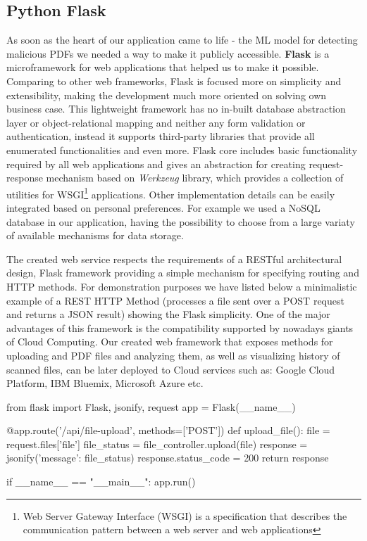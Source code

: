 \subsection{Python Flask}
As soon as the heart of our application came to life - the ML model for detecting malicious PDFs we needed a way to make it publicly accessible. \textbf{Flask} is a microframework for web applications that helped us to make it possible. Comparing to other web frameworks, Flask is focused more on simplicity and extensibility, making the development much more oriented on solving own business case. This lightweight framework has no in-built database abstraction layer or object-relational mapping and neither any form validation or authentication, instead it supports third-party libraries that provide all enumerated functionalities and even more. Flask core includes basic functionality required by all web applications and gives an abstraction for creating request-response mechanism based on \textit{Werkzeug} library, which provides a collection of utilities for WSGI\footnote{Web Server Gateway Interface (WSGI) is a specification that describes the communication pattern between a web server and web applications} applications. Other implementation details can be easily integrated based on personal preferences. For example we used a NoSQL database in our application, having the possibility to choose from a large variaty of available mechanisms for data storage. \par
The created web service respects the requirements of a RESTful architectural design, Flask framework providing a simple mechanism for specifying routing and HTTP methods. For demonstration purposes we have listed below a minimalistic example of a REST HTTP Method (processes a file sent over a POST request and returns a JSON result) showing the Flask simplicity. One of the major advantages of this framework is the compatibility supported by nowadays giants of Cloud Computing. Our created web framework that exposes methods for uploading and PDF files and analyzing them, as well as visualizing history of scanned files, can be later deployed to Cloud services such as: Google Cloud Platform, IBM Bluemix, Microsoft Azure etc. \\

\begin{python}
from flask import Flask, jsonify, request
app = Flask(__name__)

@app.route('/api/file-upload', methods=['POST'])
def upload_file():
	file = request.files['file']
	file_status = file_controller.upload(file)
	response = jsonify({'message': file_status})
	response.status_code = 200
	return response

if __name__ == "__main__":
    app.run()
\end{python}



